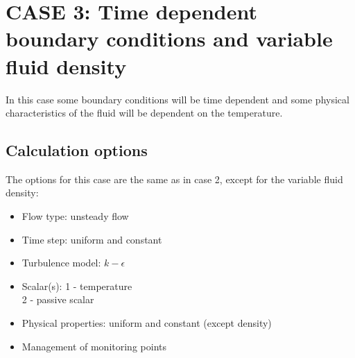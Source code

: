 
%
%
%
%


\newpage
\section{CASE 3:  Time dependent boundary conditions and variable fluid density}
In this case some boundary conditions will be time dependent and some physical
characteristics of the fluid will be dependent on the temperature.

        \subsection{Calculation options}

The options for this case are the same as in case 2, except for the variable fluid density:
\begin{itemize}
\renewcommand{\labelitemi}{$\rightarrow$}
        \item Flow type: unsteady flow
        \item Time step: uniform and constant
        \item Turbulence model: $k-\epsilon$
        \item Scalar(s): 1 - temperature\\
      \hspace*{1.6cm} 2 - passive scalar
        \item Physical properties: uniform and constant (except density)
        \item Management of monitoring points
\end{itemize}


